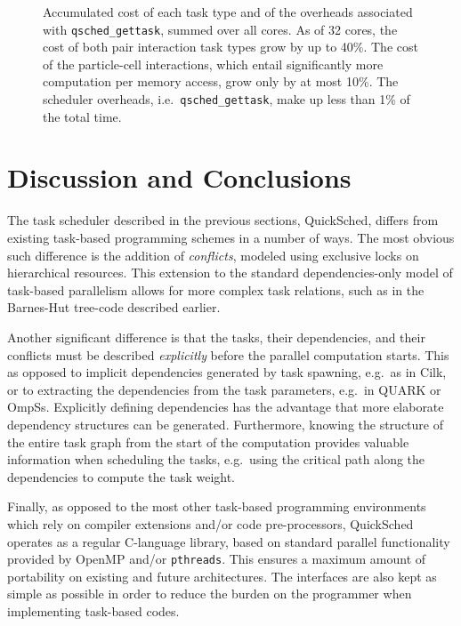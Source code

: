 \documentclass[fleqn,10pt]{wlpeerj}
\begin{document}
\begin{figure}
    \centerline{}
    \caption{Accumulated cost of each task type and of the overheads
        associated with {\tt qsched\_gettask}, summed over all cores.
        As of 32 cores, the cost of both pair interaction task
        types grow by up to 40\%.
        The cost of the particle-cell interactions, which entail significantly more
        computation per memory access, grow only by at most 10\%.
        The scheduler overheads, i.e.~{\tt qsched\_gettask},
        make up less than 1\% of the total time.}
    \label{fig:BHTimes}
\end{figure}


\section{Discussion and Conclusions}

The task scheduler described in the previous sections, QuickSched,
differs from existing task-based programming schemes
in a number of ways.
The most obvious such difference is the addition of {\em conflicts},
modeled using exclusive locks on hierarchical resources.
This extension to the standard dependencies-only model
of task-based parallelism allows for more complex task relations,
such as in the Barnes-Hut tree-code described earlier.

Another significant difference is that the tasks, their
dependencies, and their conflicts must be described
{\em explicitly} before the parallel computation starts.
This as opposed to implicit dependencies generated
by task spawning, e.g.~as in Cilk, or to extracting the
dependencies from the task parameters, e.g.~in QUARK or OmpSs.
Explicitly defining dependencies has the advantage that 
more elaborate dependency structures can be generated.
Furthermore, knowing the structure of the entire task
graph from the start of the computation provides valuable
information when scheduling the tasks, e.g.~using the 
critical path along the dependencies to compute the
task weight.

Finally, as opposed to the most other task-based
programming environments which rely on compiler extensions
and/or code pre-processors, QuickSched operates as a regular
C-language library, based on standard parallel functionality
provided by OpenMP and/or {\tt pthreads}.
This ensures a maximum amount of portability on existing
and future architectures.
The interfaces are also kept as simple
as possible in order to reduce the burden on the programmer
when implementing task-based codes.
\end{document}
